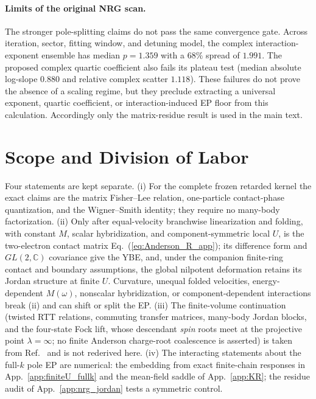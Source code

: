 \documentclass[%
  aps,physrev,onecolumn,10pt,amsmath,amssymb,superscriptaddress,longbibliography,floatfix
]{revtex4-2}
\begin{document}
\paragraph{Limits of the original NRG scan.}
The stronger pole-splitting claims do not pass the same convergence gate.
Across iteration, sector, fitting window, and detuning model, the complex
interaction-exponent ensemble has median $p=1.359$ with a $68\%$ spread of
$1.991$.  The proposed complex quartic coefficient also fails its plateau
test (median absolute log-slope $0.880$ and relative complex scatter
$1.118$).  These failures do not prove the absence of a scaling regime, but
they preclude extracting a universal exponent, quartic coefficient, or
interaction-induced EP floor from this calculation.  Accordingly only the
matrix-residue result is used in the main text.

\section{Scope and Division of Labor}
\label{app:YBE}

Four statements are kept separate.  (i) For the complete frozen retarded
kernel the exact claims are the matrix Fisher--Lee relation, one-particle
contact-phase quantization, and the Wigner--Smith identity; they require no
many-body factorization.  (ii) Only after equal-velocity branchwise
linearization and folding, with constant \(M\), scalar hybridization, and
component-symmetric local \(U\), is the two-electron contact matrix
Eq.~(\ref{eq:Anderson_R_app}); its difference form and \(GL(2,\mathbb C)\)
covariance give the YBE, and, under the companion finite-ring contact and boundary assumptions,
the global nilpotent deformation retains its Jordan structure at finite $U$.  Curvature, unequal folded velocities, energy-dependent
$M(\omega)$, nonscalar hybridization, or component-dependent interactions
break (ii) and can shift or split the EP.  (iii) The finite-volume
continuation (twisted RTT relations, commuting transfer matrices, many-body
Jordan blocks, and the four-state Fock lift, whose descendant \emph{spin}
roots meet at the projective point \(\lambda=\infty\); no finite Anderson
charge-root coalescence is asserted) is taken from
Ref.~\cite{KulkarniYB2026} and is not rederived here.  (iv) The interacting
statements about the full-$k$ pole EP are numerical: the embedding from exact finite-chain
responses in App.~\ref{app:finiteU_fullk} and the mean-field saddle of
App.~\ref{app:KR}; the residue audit of App.~\ref{app:nrg_jordan} tests a
symmetric control.
\end{document}
